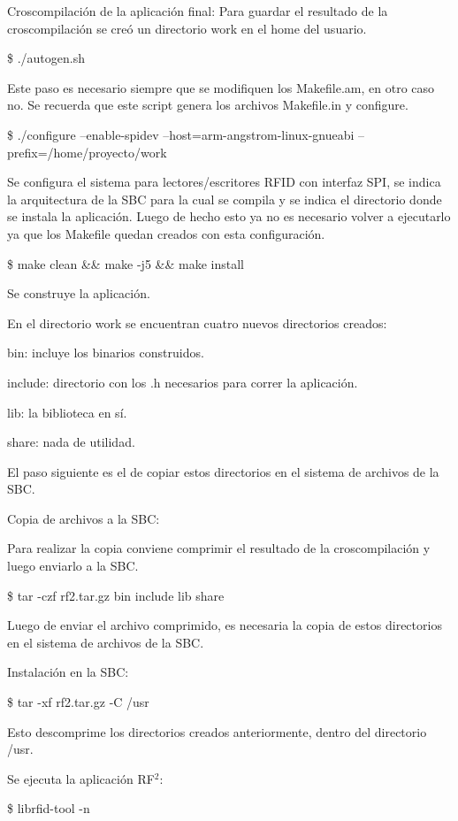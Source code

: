\bigskip
Croscompilación de la aplicación final:
Para guardar el resultado de la croscompilación se creó un directorio work en el home del usuario.

\bigskip
\centerline{\$ ./autogen.sh}
Este paso es necesario siempre que se modifiquen los Makefile.am, en otro caso no. Se recuerda que este script genera los archivos Makefile.in y configure.

\bigskip
\centerline{\$ ./configure --enable-spidev --host=arm-angstrom-linux-gnueabi --prefix=/home/proyecto/work}
Se configura el sistema para lectores/escritores RFID con interfaz SPI, se indica la arquitectura de la SBC para la cual se compila y se indica el directorio donde se instala la aplicación. Luego de hecho esto ya no es necesario volver a ejecutarlo ya que los Makefile quedan creados con esta configuración.

\centerline{\$ make clean \&\& make -j5 \&\& make install}
Se construye la aplicación.

\bigskip
En el directorio work se encuentran cuatro nuevos directorios creados:

\bigskip
bin: incluye los binarios construidos.

include: directorio con los .h necesarios para correr la aplicación.

lib: la biblioteca en sí.

share: nada de utilidad.

\bigskip
El paso siguiente es el de copiar estos directorios en el sistema de archivos de la SBC.

\bigskip
Copia de archivos a la SBC:

\bigskip
Para realizar la copia conviene comprimir el resultado de la croscompilación y luego enviarlo a la SBC.

\centerline{\$ tar -czf rf2.tar.gz bin include lib share}

\bigskip
Luego de enviar el archivo comprimido, es necesaria la copia de estos directorios en el sistema de archivos de la SBC.

\bigskip
Instalación en la SBC:

\centerline{\$ tar -xf rf2.tar.gz -C /usr}
Esto descomprime los directorios creados anteriormente, dentro del directorio /usr.

\bigskip
Se ejecuta la aplicación RF$^{2}$:

\centerline{\$ librfid-tool -n}

